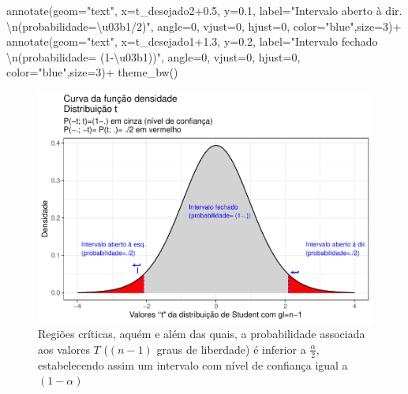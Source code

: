 \documentclass[
]{book}
\newenvironment{Shaded}{\begin{snugshade}}{\end{snugshade}}
\newcommand{\AttributeTok}[1]{\textcolor[rgb]{0.77,0.63,0.00}{#1}}
\newcommand{\DecValTok}[1]{\textcolor[rgb]{0.00,0.00,0.81}{#1}}
\newcommand{\FloatTok}[1]{\textcolor[rgb]{0.00,0.00,0.81}{#1}}
\newcommand{\FunctionTok}[1]{\textcolor[rgb]{0.00,0.00,0.00}{#1}}
\newcommand{\NormalTok}[1]{#1}
\newcommand{\SpecialCharTok}[1]{\textcolor[rgb]{0.00,0.00,0.00}{#1}}
\newcommand{\StringTok}[1]{\textcolor[rgb]{0.31,0.60,0.02}{#1}}
\begin{document}
\begin{Shaded}
\begin{Highlighting}[]
  \FunctionTok{annotate}\NormalTok{(}\AttributeTok{geom=}\StringTok{"text"}\NormalTok{, }\AttributeTok{x=}\NormalTok{t\_desejado2}\FloatTok{+0.5}\NormalTok{, }\AttributeTok{y=}\FloatTok{0.1}\NormalTok{, }\AttributeTok{label=}\StringTok{"Intervalo aberto à dir. }\SpecialCharTok{\textbackslash{}n}\StringTok{(probabilidade=\textbackslash{}u03b1/2)"}\NormalTok{, }\AttributeTok{angle=}\DecValTok{0}\NormalTok{, }\AttributeTok{vjust=}\DecValTok{0}\NormalTok{, }\AttributeTok{hjust=}\DecValTok{0}\NormalTok{, }\AttributeTok{color=}\StringTok{"blue"}\NormalTok{,}\AttributeTok{size=}\DecValTok{3}\NormalTok{)}\SpecialCharTok{+}
  \FunctionTok{annotate}\NormalTok{(}\AttributeTok{geom=}\StringTok{"text"}\NormalTok{, }\AttributeTok{x=}\NormalTok{t\_desejado1}\FloatTok{+1.3}\NormalTok{, }\AttributeTok{y=}\FloatTok{0.2}\NormalTok{, }\AttributeTok{label=}\StringTok{"Intervalo fechado }\SpecialCharTok{\textbackslash{}n}\StringTok{(probabilidade= (1{-}\textbackslash{}u03b1))"}\NormalTok{, }\AttributeTok{angle=}\DecValTok{0}\NormalTok{, }\AttributeTok{vjust=}\DecValTok{0}\NormalTok{, }\AttributeTok{hjust=}\DecValTok{0}\NormalTok{, }\AttributeTok{color=}\StringTok{"blue"}\NormalTok{,}\AttributeTok{size=}\DecValTok{3}\NormalTok{)}\SpecialCharTok{+}  \FunctionTok{theme\_bw}\NormalTok{()}
\end{Highlighting}
\end{Shaded}

\begin{figure}

{\centering \includegraphics[width=1\linewidth]{apostila_files/figure-latex/fig58-1} 

}

\caption{Regiões críticas, aquém e além das quais, a probabilidade associada aos valores $T$ ($(n-1)$ graus de liberdade) é inferior a $\frac{\alpha}{2}$, estabelecendo assim um intervalo com nível de confiança igual a $(1-\alpha)$}\label{fig:fig58}
\end{figure}
\end{document}
